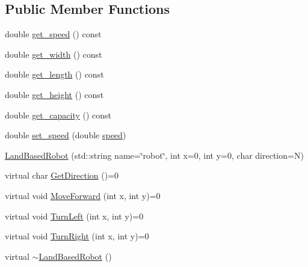 \subsection*{Public Member Functions}
\begin{DoxyCompactItemize}
\item 
double \hyperlink{classfp_1_1_land_based_robot_a44fed3a00505f6679ff8505aebae4505}{get\+\_\+speed} () const
\item 
double \hyperlink{classfp_1_1_land_based_robot_a523b439167030a7ab1e0e7f6c8d42315}{get\+\_\+width} () const
\item 
double \hyperlink{classfp_1_1_land_based_robot_adb03fbded9a3b0553301bcc0322cb1c1}{get\+\_\+length} () const
\item 
double \hyperlink{classfp_1_1_land_based_robot_ac77253c989c417ee26654541c50669d4}{get\+\_\+height} () const
\item 
double \hyperlink{classfp_1_1_land_based_robot_a24c0f6d395f3dfd6bdbcf5a2a9801de1}{get\+\_\+capacity} () const
\item 
double \hyperlink{classfp_1_1_land_based_robot_abddbc887170ed70d2c719cfdf9fed0b7}{set\+\_\+speed} (double \hyperlink{classfp_1_1_land_based_robot_a098908304491425d6264e59d9412e696}{speed})
\item 
\hyperlink{classfp_1_1_land_based_robot_ada2929900b46143a62ce8f0f53ada0f8}{Land\+Based\+Robot} (std\+::string name=\char`\"{}robot\char`\"{}, int x=0, int y=0, char direction=\textquotesingle{}N\textquotesingle{})
\item 
virtual char \hyperlink{classfp_1_1_land_based_robot_a50841b6e40d4e92832770d26b427fea2}{Get\+Direction} ()=0
\item 
virtual void \hyperlink{classfp_1_1_land_based_robot_a25ed5c4c524e68cc983104a8da57599b}{Move\+Forward} (int x, int y)=0
\item 
virtual void \hyperlink{classfp_1_1_land_based_robot_a359e1012e9093475b7a1b0d38e41a118}{Turn\+Left} (int x, int y)=0
\item 
virtual void \hyperlink{classfp_1_1_land_based_robot_a7360e4084bc5254f72ab0d3612644907}{Turn\+Right} (int x, int y)=0
\item 
virtual \hyperlink{classfp_1_1_land_based_robot_acfe49650459e4e6c72b87e6eff1072d9}{$\sim$\+Land\+Based\+Robot} ()
\end{DoxyCompactItemize}
